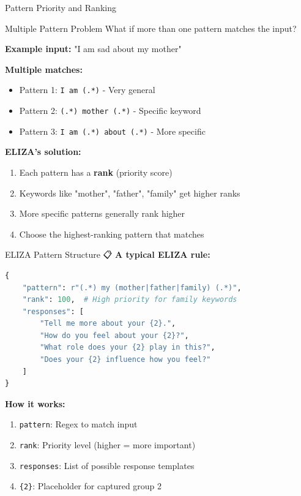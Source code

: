 \documentclass[aspectratio=169]{beamer}
\begin{document}
\begin{frame}[shrink=10]{Pattern Priority and Ranking 🎯}
\small
\begin{block}{Multiple Pattern Problem}
What if more than one pattern matches the input?
\end{block}

\vspace{0.3cm}

\textbf{Example input:} "I am sad about my mother"

\textbf{Multiple matches:}
\begin{itemize}\setlength{\itemsep}{0pt}
    \item Pattern 1: \texttt{I am (.*)} - Very general
    \item Pattern 2: \texttt{(.*) mother (.*)} - Specific keyword
    \item Pattern 3: \texttt{I am (.*) about (.*)} - More specific
\end{itemize}

\vspace{0.3cm}

\textbf{ELIZA's solution:}
\begin{enumerate}\setlength{\itemsep}{0pt}
    \item Each pattern has a \textbf{rank} (priority score)
    \item Keywords like "mother", "father", "family" get higher ranks
    \item More specific patterns generally rank higher
    \item Choose the highest-ranking pattern that matches
\end{enumerate}
\end{frame}

\begin{frame}[fragile]{ELIZA Pattern Structure 📋}
\textbf{A typical ELIZA rule:}

\begin{lstlisting}[language=Python, basicstyle=\ttfamily\tiny]
{
    "pattern": r"(.*) my (mother|father|family) (.*)",
    "rank": 100,  # High priority for family keywords
    "responses": [
        "Tell me more about your {2}.",
        "How do you feel about your {2}?",
        "What role does your {2} play in this?",
        "Does your {2} influence how you feel?"
    ]
}
\end{lstlisting}

\vspace{0.3cm}

\textbf{How it works:}
\begin{enumerate}\setlength{\itemsep}{0pt}
    \item \texttt{pattern}: Regex to match input
    \item \texttt{rank}: Priority level (higher = more important)
    \item \texttt{responses}: List of possible response templates
    \item \texttt{\{2\}}: Placeholder for captured group 2
\end{enumerate}
\end{frame}
\end{document}
